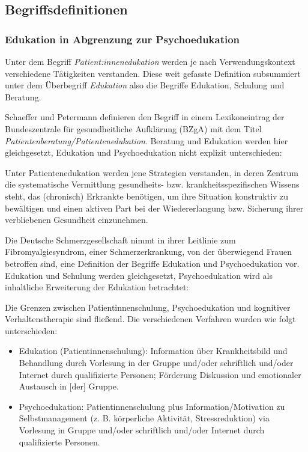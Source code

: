 \documentclass[
  twoside,
  parskip=half-,
]{scrreprt}
\begin{document}
\subsection{Begriffsdefinitionen}

\subsubsection{Edukation in Abgrenzung zur Psychoedukation}\label{edupsycho}
Unter dem Begriff \textit{Patient:innenedukation} werden je nach Verwendungskontext verschiedene Tätigkeiten verstanden.  Diese weit gefasste Definition subsummiert unter dem Überbegriff \textit{Edukation} also die Begriffe Edukation, Schulung und Beratung.

Schaeffer und Petermann definieren den Begriff in einem Lexikoneintrag der Bundeszentrale für gesundheitliche Aufklärung (BZgA) mit dem Titel \textit{Patientenberatung/Patientenedukation}. Beratung und Edukation werden hier gleichgesetzt, Edukation und Psychoedukation nicht explizit unterschieden:

\begin{displayquote}
  Unter Patientenedukation werden jene Strategien verstanden, in deren Zentrum die systematische Vermittlung gesundheits- bzw. krankheitsspezifischen Wissens steht, das (chronisch) Erkrankte benötigen, um ihre Situation konstruktiv zu bewältigen und einen aktiven Part bei der Wiedererlangung bzw. Sicherung ihrer verbliebenen Gesundheit einzunehmen.
\end{displayquote}

Die Deutsche Schmerzgesellschaft nimmt in ihrer Leitlinie zum Fibromyalgiesyndrom, einer Schmerzerkrankung, von der überwiegend Frauen betroffen sind, eine Definition der Begriffe Edukation und Psychoedukation vor. Edukation und Schulung werden gleichgesetzt, Psychoedukation wird als inhaltliche Erweiterung der Edukation betrachtet:

\begin{displayquote}
Die Grenzen zwischen Patientinnenschulung, Psychoedukation und kognitiver Verhaltenstherapie sind fließend. Die verschiedenen Verfahren wurden wie
folgt unterschieden:
\begin{itemize}
  \item Edukation (Patientinnenschulung): Information über Krankheitsbild und
  Behandlung durch Vorlesung in der Gruppe und/oder schriftlich und/oder
  Internet durch qualifizierte Personen; Förderung Diskussion und emotionaler
  Austausch in [der] Gruppe.
  \item Psychoedukation: Patientinnenschulung plus Information/Motivation zu
  Selbstmanagement (z. B. körperliche Aktivität, Stressreduktion) via Vorlesung
  in Gruppe und/oder schriftlich und/oder Internet durch qualifizierte Personen.
\end{itemize}
\end{displayquote}
\end{document}
